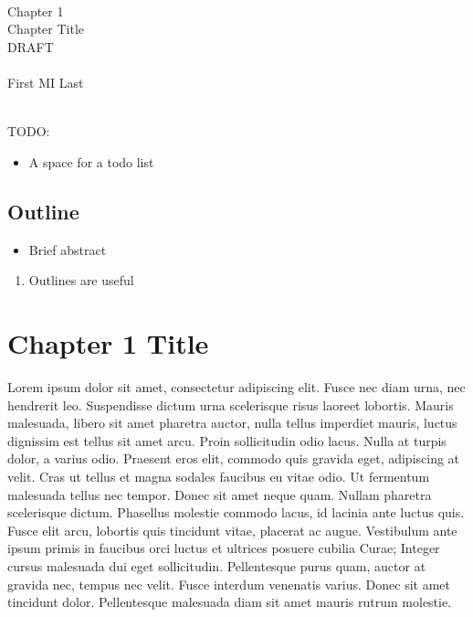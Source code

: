 \documentclass[draftthesis,fullpage,offcenter]{uiucthesis2009}
\begin{document}
		
	\setcounter{chapter}{0}
	\mainmatter
	
	\begin{center}
	~\\~\\~\\
		{\Large Chapter 1\\}
		{\LARGE Chapter Title\\}
		{\Huge DRAFT\\}~\\
		{\Large First MI Last\\}
	\end{center}
	~\\
	{\Large TODO:}
	\begin{itemize}
		\item A space for a todo list
	\end{itemize}

	\thispagestyle{empty}
	\newpage
	
	\section*{Outline}
	
	\begin{itemize}
		\item Brief abstract
	\end{itemize}
	\begin{enumerate}
		\item Outlines are useful
	\end{enumerate}
	
	\thispagestyle{empty}
	\newpage
	\setcounter{page}{1}
\else
\fi
	
\graphicspath{{./fig_ch1/}}


\chapter{Chapter 1 Title}\label{ch:chapter1_label}

Lorem ipsum dolor sit amet, consectetur adipiscing elit. Fusce nec diam urna, 
nec hendrerit leo. Suspendisse dictum urna scelerisque risus laoreet lobortis. 
Mauris malesuada, libero sit amet pharetra auctor, nulla tellus imperdiet 
mauris, luctus dignissim est tellus sit amet arcu. Proin sollicitudin odio 
lacus. Nulla at turpis dolor, a varius odio. Praesent eros elit, commodo quis 
gravida eget, adipiscing at velit. Cras ut tellus et magna sodales faucibus eu 
vitae odio. Ut fermentum malesuada tellus nec tempor. Donec sit amet neque quam. 
Nullam pharetra scelerisque dictum. Phasellus molestie commodo lacus, id lacinia 
ante luctus quis. Fusce elit arcu, lobortis quis tincidunt vitae, placerat ac 
augue. Vestibulum ante ipsum primis in faucibus orci luctus et ultrices posuere 
cubilia Curae; Integer cursus malesuada dui eget sollicitudin. Pellentesque 
purus quam, auctor at gravida nec, tempus nec velit. Fusce interdum venenatis 
varius. Donec sit amet tincidunt dolor. Pellentesque malesuada diam sit amet 
mauris rutrum molestie.
\end{document}
